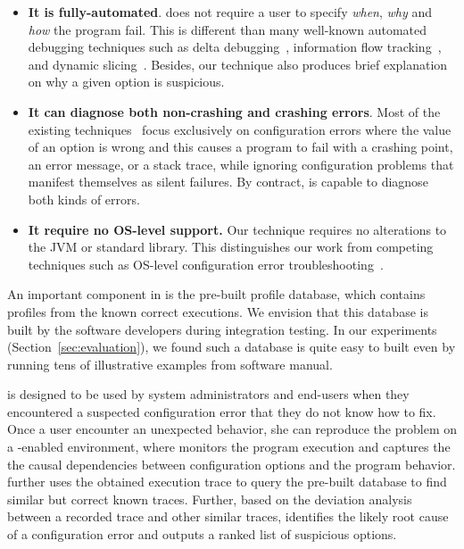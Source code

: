 \begin{itemize}
\item \textbf{It is fully-automated}.
\ourtool does not require a user to specify
\textit{when}, \textit{why} and \textit{how} the program fail. This is
different than many well-known automated debugging techniques such
as delta debugging~\cite{Zeller:2002:ICC}, information flow tracking~\cite{Attariyan:2010:ACT},
 and dynamic slicing~\cite{Zhang:2003:PDS}.
Besides, our technique also produces brief explanation on
why a given option is suspicious. 

\item \textbf{It can diagnose both non-crashing and crashing errors}.
Most of the existing techniques~\cite{Rabkin:2011:PPC,
Whitaker:2004:CDS, Attariyan:2010:ACT} focus exclusively on configuration errors
where the value of an option is wrong and this causes a program
to fail with a crashing point, an error message, or a stack trace, while
ignoring configuration problems that manifest themselves as
silent failures. By contract, \ourtool is capable to diagnose
both kinds of errors.

\item \textbf{It require no OS-level support.} Our technique requires no alterations to
the JVM or standard library. This distinguishes our work from
competing techniques such as OS-level configuration
error troubleshooting~\cite{Whitaker:2004:CDS}.%

\end{itemize}

An important component in \ourtool is the pre-built
profile database, which contains profiles
from the known correct executions. We envision that this database is
built by the software developers during integration testing.
In our experiments (Section~\ref{sec:evaluation}), we
found such a database is quite easy to built even by running
tens of illustrative examples from software manual.


\ourtool is designed to be used by system administrators and end-users when they
encountered a suspected configuration error that they do not
know how to fix. Once a \ourtool user encounter an unexpected
behavior, she can reproduce the problem on a \ourtool-enabled environment,
where \ourtool monitors the program execution and captures
the the causal dependencies between
configuration options and the program behavior. \ourtool
further uses the obtained execution trace to query the pre-built database
to find similar but correct known traces. Further, based on
the deviation analysis between a recorded trace and other similar traces,
\ourtool identifies the likely root cause of a configuration error and
outputs a ranked list of suspicious options.

